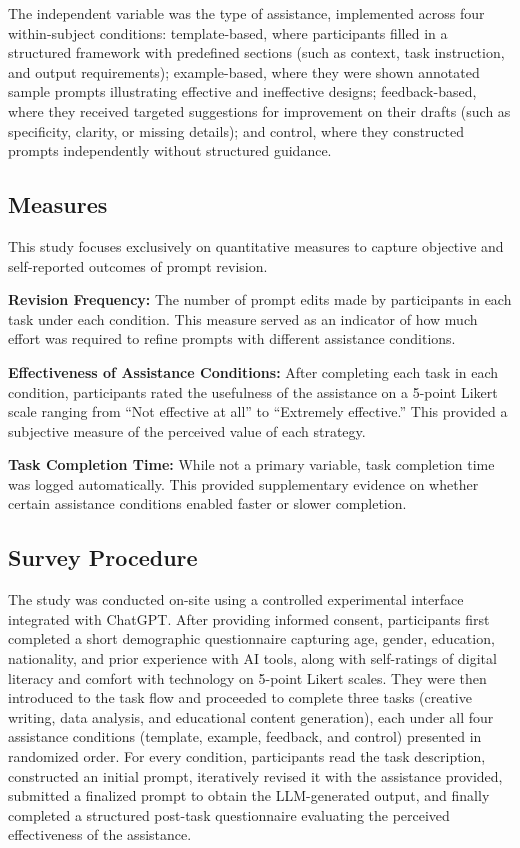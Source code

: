 The independent variable was the type of assistance, implemented across four within-subject conditions: template-based, where participants filled in a structured framework with predefined sections (such as context, task instruction, and output requirements); example-based, where they were shown annotated sample prompts illustrating effective and ineffective designs; feedback-based, where they received targeted suggestions for improvement on their drafts (such as specificity, clarity, or missing details); and control, where they constructed prompts independently without structured guidance.

\subsection{\textbf{Measures}}

This study focuses exclusively on quantitative measures to capture objective and self-reported outcomes of prompt revision.

\textbf{Revision Frequency:} The number of prompt edits made by participants in each task under each condition. This measure served as an indicator of how much effort was required to refine prompts with different assistance conditions.

\textbf{Effectiveness of Assistance Conditions:} After completing each task in each condition, participants rated the usefulness of the assistance on a 5-point Likert scale ranging from ``Not effective at all'' to ``Extremely effective.'' This provided a subjective measure of the perceived value of each strategy.

\textbf{Task Completion Time:} While not a primary variable, task completion time was logged automatically. This provided supplementary evidence on whether certain assistance conditions enabled faster or slower completion.

\subsection{\textbf{Survey Procedure}}

The study was conducted on-site using a controlled experimental interface integrated with ChatGPT. After providing informed consent, participants first completed a short demographic questionnaire capturing age, gender, education, nationality, and prior experience with AI tools, along with self-ratings of digital literacy and comfort with technology on 5-point Likert scales. They were then introduced to the task flow and proceeded to complete three tasks (creative writing, data analysis, and educational content generation), each under all four assistance conditions (template, example, feedback, and control) presented in randomized order. For every condition, participants read the task description, constructed an initial prompt, iteratively revised it with the assistance provided, submitted a finalized prompt to obtain the LLM-generated output, and finally completed a structured post-task questionnaire evaluating the perceived effectiveness of the assistance.

